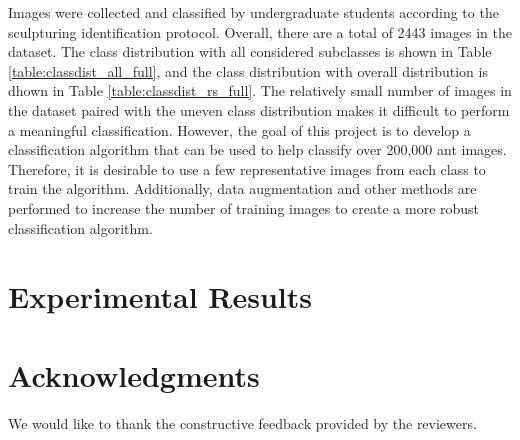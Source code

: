 \documentclass{aci}
\begin{document}
Images were collected and classified by undergraduate students according to the
sculpturing identification protocol. Overall, there are a total of 2443 images
in the dataset. The class distribution with all considered subclasses is shown
in Table \ref{table:classdist_all_full}, and the class distribution with overall
distribution is dhown in Table \ref{table:classdist_rs_full}. The relatively
small number of images in the dataset paired with the uneven class distribution
makes it difficult to perform a meaningful classification. However, the goal of
this project is to develop a classification algorithm that can be used to help
classify over 200,000 ant images. Therefore, it is desirable to use a few
representative images from each class to train the algorithm. Additionally, data
augmentation and other methods are performed to increase the number of training
images to create a more robust classification algorithm.

\section{Experimental Results}


\section*{Acknowledgments}
We would like to thank the constructive feedback provided by the reviewers.



\end{document}
